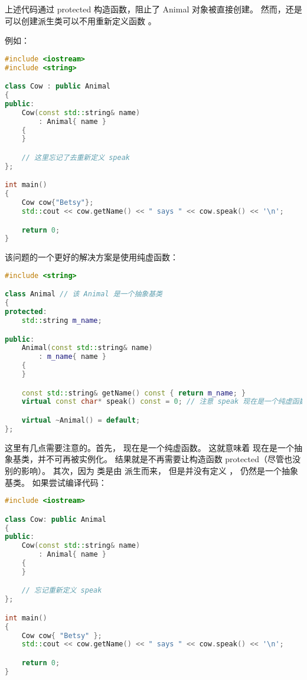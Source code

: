 \documentclass[../../LearnCpp.tex]{subfiles}
\begin{document}
上述代码通过 protected 构造函数，阻止了 Animal 对象被直接创建。
然而，还是可以创建派生类可以不用重新定义函数 。

例如：

\begin{lstlisting}[language=C++]
#include <iostream>
#include <string>

class Cow : public Animal
{
public:
    Cow(const std::string& name)
        : Animal{ name }
    {
    }

    // 这里忘记了去重新定义 speak
};

int main()
{
    Cow cow{"Betsy"};
    std::cout << cow.getName() << " says " << cow.speak() << '\n';

    return 0;
}
\end{lstlisting}

该问题的一个更好的解决方案是使用纯虚函数：

\begin{lstlisting}[language=C++]
#include <string>

class Animal // 该 Animal 是一个抽象基类
{
protected:
    std::string m_name;

public:
    Animal(const std::string& name)
        : m_name{ name }
    {
    }

    const std::string& getName() const { return m_name; }
    virtual const char* speak() const = 0; // 注意 speak 现在是一个纯虚函数

    virtual ~Animal() = default;
};
\end{lstlisting}

这里有几点需要注意的。首先， 现在是一个纯虚函数。
这就意味着  现在是一个抽象基类，并不可再被实例化。
结果就是不再需要让构造函数 protected（尽管也没别的影响）。
其次，因为  类是由  派生而来，
但是并没有定义 ， 仍然是一个抽象基类。
如果尝试编译代码：

\begin{lstlisting}[language=C++]
#include <iostream>

class Cow: public Animal
{
public:
    Cow(const std::string& name)
        : Animal{ name }
    {
    }

    // 忘记重新定义 speak
};

int main()
{
    Cow cow{ "Betsy" };
    std::cout << cow.getName() << " says " << cow.speak() << '\n';

    return 0;
}
\end{lstlisting}
\end{document}
